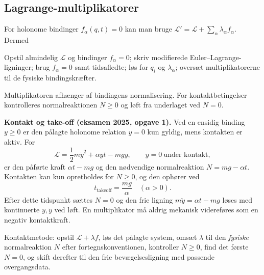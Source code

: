 \subsection{Lagrange-multiplikatorer}\label{sec:lambda}
For holonome bindinger $f_\alpha(q,t)=0$ kan man bruge $\mathcal L'=\mathcal L+\sum_\alpha\lambda_\alpha f_\alpha$. Dermed
\begin{method}Opstil almindelig $\mathcal L$ og bindinger $f_\alpha=0$; skriv modifierede Euler--Lagrange-ligninger; brug $f_\alpha=0$ samt tidsafledte; løs for $q_i$ og $\lambda_\alpha$; oversæt multiplikatorerne til de fysiske bindingskræfter.\end{method}
\begin{note}Multiplikatoren afhænger af bindingens normalisering. For kontaktbetingelser kontrolleres normalreaktionen $N\geq0$ og løft fra underlaget ved $N=0$.\end{note}
\textbf{Kontakt og take-off (eksamen 2025, opgave 1).}
Ved en ensidig binding $y\ge0$ er den pålagte holonome relation $y=0$ kun gyldig, mens kontakten er aktiv. For
\[
\mathcal L=\frac12m\dot y^2+\alpha yt-mgy,
\qquad y=0\ \text{under kontakt},
\]
er den påførte kraft $\alpha t-mg$ og den nødvendige normalreaktion
$N=mg-\alpha t$. Kontakten kan kun opretholdes for $N\ge0$, og den ophører ved
\[
\boxed{t_{\mathrm{takeoff}}=\frac{mg}{\alpha}}\quad(\alpha>0).
\]
Efter dette tidspunkt sættes $N=0$ og den frie ligning $m\ddot y=\alpha t-mg$ løses med kontinuerte $y,\dot y$ ved løft. En multiplikator må aldrig mekanisk videreføres som en negativ kontaktkraft.
\begin{method}Kontaktmetode: opstil $\mathcal L+\lambda f$, løs det pålagte system, omsæt $\lambda$ til den \emph{fysiske} normalreaktion $N$ efter fortegnskonventionen, kontroller $N\ge0$, find det første $N=0$, og skift derefter til den frie bevægelsesligning med passende overgangsdata.\end{method}



